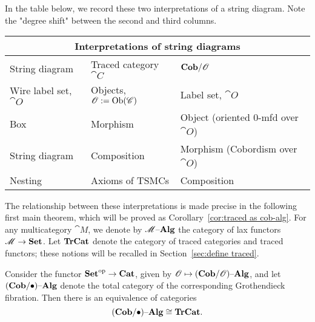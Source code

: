 \documentclass[12pt,oneside,article,draft]{memoir}
\begin{document}
In the table below, we record these two interpretations of a string diagram. Note the "degree shift" between the second and third columns.
\begin{center}
\begin{tabular}{lll}
\toprule
\multicolumn{3}{c}{Interpretations of string diagrams} \\
\midrule
String diagram & Traced category $\cat{C}$ & $\mathbf{Cob}/\mathscr{O}$ \\
\midrule
Wire label set, $\cat{O}$ & Objects, $\mathscr{O}:=\operatorname{Ob}(\mathscr{C})$ & Label set, $\cat{O}$ \\
Box & Morphism & Object (oriented 0-mfd over $\cat{O}$) \\
String diagram & Composition & Morphism (Cobordism over $\cat{O}$) \\
Nesting & Axioms of TSMCs & Composition \\
\bottomrule
\end{tabular}
\end{center}

The relationship between these interpretations is made precise in the following first main theorem, which will be proved as Corollary~\ref{cor:traced as cob-alg}. For any multicategory $\cat{M}$, we denote by $\mathscr{M}{\text \textendash}\mathbf{Alg}$ the category of lax functors $\mathscr{M}\to\mathbf{Set}$. Let $\mathbf{TrCat}$ denote the category of traced categories and traced functors; these notions will be recalled in Section~\ref{sec:define traced}.

\begin{theorem}\label{thm:traced as cob-alg}
Consider the functor ${\mathbf{Set}}^{\text{op}}\to\mathbf{Cat}$, given by $\mathscr{O}\mapsto(\mathbf{Cob}/\mathscr{O}){\text \textendash}\mathbf{Alg}$, and let $(\mathbf{Cob}/\bullet){\text \textendash}\mathbf{Alg}$ denote the total category of the corresponding Grothendieck fibration. Then there is an equivalence of categories
$$(\mathbf{Cob}/\bullet){\text \textendash}\mathbf{Alg}\cong\mathbf{TrCat}.$$
\end{theorem}
\end{document}
